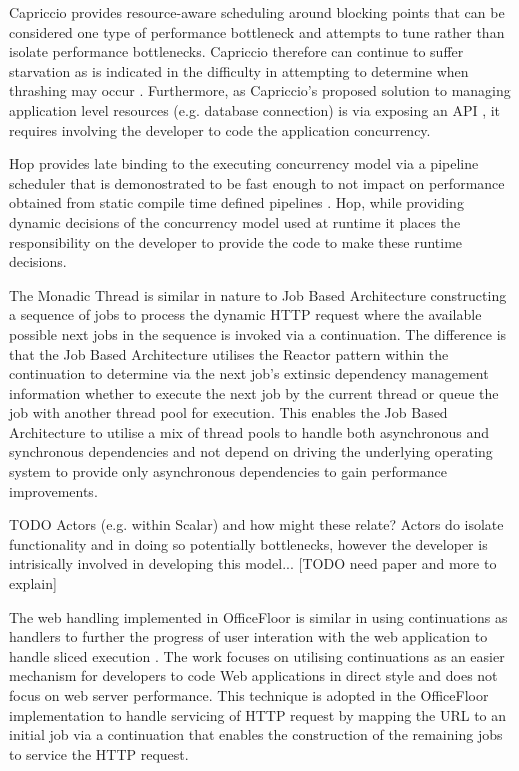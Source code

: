 \documentclass[conference]{ieee/IEEEtran}
\begin{document}
Capriccio provides resource-aware scheduling around blocking points
\cite{capriccio} that can be considered one type of performance bottleneck and
attempts to tune rather than isolate performance bottlenecks.  Capriccio
therefore can continue to suffer starvation as is indicated in the difficulty in
attempting to determine when thrashing may occur \cite{capriccio}. Furthermore,
as Capriccio's proposed solution to managing application level resources (e.g.
database connection) is via exposing an API \cite{capriccio}, it requires
involving the developer to code the application concurrency.
   
Hop provides late binding to the executing concurrency model via a pipeline
scheduler that is demonostrated to be fast enough to not impact on performance
obtained from static compile time defined pipelines \cite{hop}.  Hop,
while providing dynamic decisions of the concurrency model used at runtime it places
the responsibility on the developer to provide the code to make these runtime
decisions.
   
The Monadic Thread \cite{monadic-thread} is similar in nature to Job Based Architecture
constructing a sequence of jobs to process the dynamic HTTP request where the
available possible next jobs in the sequence is invoked via a continuation. 
The difference is that the Job Based Architecture utilises the Reactor pattern
within the continuation to determine via the next job's extinsic dependency
management information whether to execute the next job by the current thread or
queue the job with another thread pool for execution.  This enables the Job
Based Architecture to utilise a mix of thread pools to handle both asynchronous
and synchronous dependencies and not depend on driving the underlying operating
system to provide only asynchronous dependencies to gain performance
improvements.
   
TODO Actors (e.g. within Scalar) and how might these relate?  Actors do isolate
functionality and in doing so potentially bottlenecks, however the developer is
intrisically involved in developing this model...   [TODO need paper and more
to explain]
   
The web handling implemented in OfficeFloor is similar in using continuations
as handlers to further the progress of user interation with the web application
to handle sliced execution \cite{url-continuation}.  The work focuses on utilising
continuations as an easier mechanism for developers to code Web applications in
direct style and does not focus on web server performance.  This technique is
adopted in the OfficeFloor implementation to handle servicing of HTTP request
by mapping the URL to an initial job via a continuation that enables the
construction of the remaining jobs to service the HTTP request.
\end{document}
